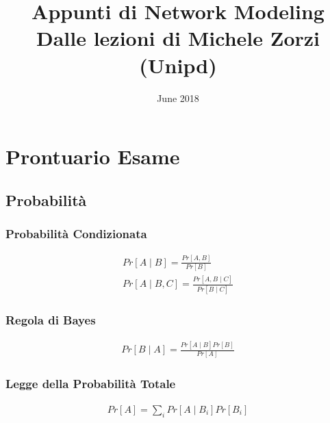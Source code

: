 \documentclass{article}
\title{Appunti di Network Modeling\\
\vspace{1cm}
\large
Dalle lezioni di Michele Zorzi (Unipd)}
\date{June 2018}
\begin{document}
\maketitle
\tableofcontents



\newpage
\section{Prontuario Esame}

\subsection{Probabilità}

\subsubsection{Probabilità Condizionata}
\begin{align*}
Pr[A\mid B] = \frac{Pr[A,B]}{Pr[B]}\\
Pr[A\mid B, C] = \frac{Pr[A,B\mid C]}{Pr[B\mid C]}
\end{align*}

\subsubsection{Regola di Bayes}
\begin{align*}
Pr[B\mid A] = \frac{Pr[A\mid B]Pr[B]}{Pr[A]}
\end{align*}

\subsubsection{Legge della Probabilità Totale}
\begin{align*}
Pr[A] = \sum_i Pr[A\mid B_i] Pr[B_i]
\end{align*}
\end{document}
